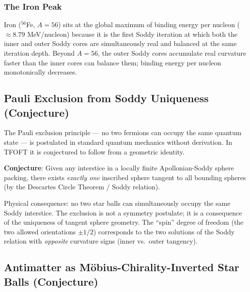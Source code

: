 \documentclass[11pt,a4paper]{article}
\begin{document}
\subsubsection{The Iron Peak}

Iron ($^{56}$Fe, $A=56$) sits at the global maximum of binding energy per nucleon
($\approx 8.79$ MeV/nucleon) because it is the first Soddy iteration at which both
the inner and outer Soddy cores are simultaneously real and balanced at the same
iteration depth. Beyond $A=56$, the outer Soddy cores accumulate real curvature
faster than the inner cores can balance them; binding energy per nucleon
monotonically decreases.

\subsection{Pauli Exclusion from Soddy Uniqueness (Conjecture)}

The Pauli exclusion principle --- no two fermions can occupy the same quantum state
--- is postulated in standard quantum mechanics without derivation. In TFOFT it is
conjectured to follow from a geometric identity.

\textbf{Conjecture}: Given any interstice in a locally finite Apollonian-Soddy
sphere packing, there exists \emph{exactly one} inscribed sphere tangent to all
bounding spheres (by the Descartes Circle Theorem / Soddy relation).

Physical consequence: no two star balls can simultaneously occupy the same Soddy
interstice. The exclusion is not a symmetry postulate; it is a consequence of the
uniqueness of tangent sphere geometry. The ``spin'' degree of freedom (the two
allowed orientations $\pm 1/2$) corresponds to the two solutions of the Soddy
relation with \emph{opposite} curvature signs (inner vs.\ outer tangency).

\subsection{Antimatter as M\"obius-Chirality-Inverted Star Balls (Conjecture)}
\end{document}
